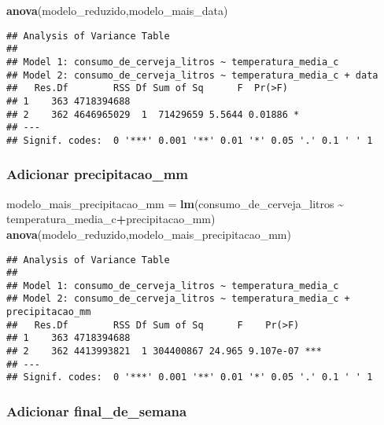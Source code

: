 \documentclass[
]{article}
\newenvironment{Shaded}{\begin{snugshade}}{\end{snugshade}}
\newcommand{\FunctionTok}[1]{\textcolor[rgb]{0.13,0.29,0.53}{\textbf{#1}}}
\newcommand{\NormalTok}[1]{#1}
\newcommand{\OtherTok}[1]{\textcolor[rgb]{0.56,0.35,0.01}{#1}}
\newcommand{\SpecialCharTok}[1]{\textcolor[rgb]{0.81,0.36,0.00}{\textbf{#1}}}
\begin{document}
\begin{Shaded}
\begin{Highlighting}[]
\FunctionTok{anova}\NormalTok{(modelo\_reduzido,modelo\_mais\_data)}
\end{Highlighting}
\end{Shaded}

\begin{verbatim}
## Analysis of Variance Table
## 
## Model 1: consumo_de_cerveja_litros ~ temperatura_media_c
## Model 2: consumo_de_cerveja_litros ~ temperatura_media_c + data
##   Res.Df        RSS Df Sum of Sq      F  Pr(>F)  
## 1    363 4718394688                              
## 2    362 4646965029  1  71429659 5.5644 0.01886 *
## ---
## Signif. codes:  0 '***' 0.001 '**' 0.01 '*' 0.05 '.' 0.1 ' ' 1
\end{verbatim}

\hypertarget{adicionar-precipitacao_mm}{%
\subsubsection{Adicionar
precipitacao\_mm}\label{adicionar-precipitacao_mm}}

\begin{Shaded}
\begin{Highlighting}[]
\NormalTok{modelo\_mais\_precipitacao\_mm }\OtherTok{=} \FunctionTok{lm}\NormalTok{(consumo\_de\_cerveja\_litros }\SpecialCharTok{\textasciitilde{}}\NormalTok{ temperatura\_media\_c}\SpecialCharTok{+}\NormalTok{precipitacao\_mm)}
\FunctionTok{anova}\NormalTok{(modelo\_reduzido,modelo\_mais\_precipitacao\_mm)}
\end{Highlighting}
\end{Shaded}

\begin{verbatim}
## Analysis of Variance Table
## 
## Model 1: consumo_de_cerveja_litros ~ temperatura_media_c
## Model 2: consumo_de_cerveja_litros ~ temperatura_media_c + precipitacao_mm
##   Res.Df        RSS Df Sum of Sq      F    Pr(>F)    
## 1    363 4718394688                                  
## 2    362 4413993821  1 304400867 24.965 9.107e-07 ***
## ---
## Signif. codes:  0 '***' 0.001 '**' 0.01 '*' 0.05 '.' 0.1 ' ' 1
\end{verbatim}

\hypertarget{adicionar-final_de_semana}{%
\subsubsection{Adicionar
final\_de\_semana}\label{adicionar-final_de_semana}}
\end{document}
